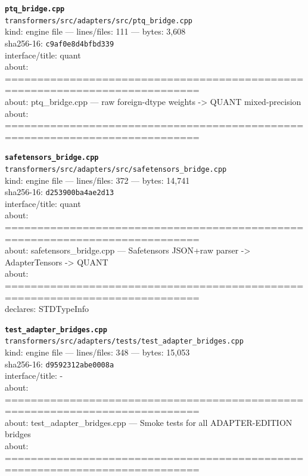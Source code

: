\noindent\textbf{\texttt{ptq\_bridge.cpp}}\\
\texttt{transformers/src/adapters/src/ptq\_bridge.cpp}\\
kind: engine file --- lines/files: 111 --- bytes: 3,608\\
sha256-16: \texttt{c9af0e8d4bfbd339}\\
interface/title: quant\\
about: ============================================================================\\
about: ptq\_bridge.cpp — raw foreign-dtype weights -> QUANT mixed-precision\\
about: ============================================================================\\
\vspace*{6.0pt}
\newpage

\noindent\textbf{\texttt{safetensors\_bridge.cpp}}\\
\texttt{transformers/src/adapters/src/safetensors\_bridge.cpp}\\
kind: engine file --- lines/files: 372 --- bytes: 14,741\\
sha256-16: \texttt{d253900ba4ae2d13}\\
interface/title: quant\\
about: ============================================================================\\
about: safetensors\_bridge.cpp — Safetensors JSON+raw parser -> AdapterTensors -> QUANT\\
about: ============================================================================\\
declares: STDTypeInfo\\
\vspace*{6.0pt}

\noindent\textbf{\texttt{test\_adapter\_bridges.cpp}}\\
\texttt{transformers/src/adapters/tests/test\_adapter\_bridges.cpp}\\
kind: engine file --- lines/files: 348 --- bytes: 15,053\\
sha256-16: \texttt{d9592312abe0008a}\\
interface/title: -\\
about: ============================================================================\\
about: test\_adapter\_bridges.cpp — Smoke tests for all ADAPTER-EDITION bridges\\
about: ============================================================================\\
\vspace*{6.0pt}

